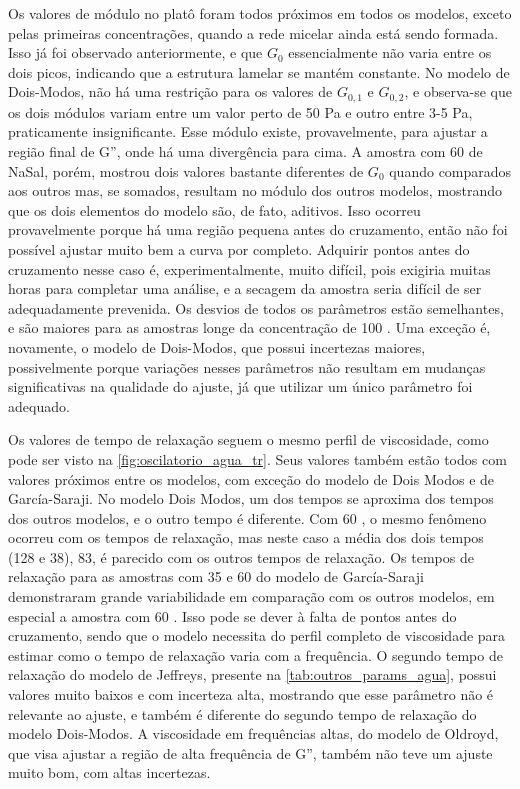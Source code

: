 	Os valores de módulo no platô foram todos próximos em todos os modelos, exceto pelas primeiras concentrações, quando a rede micelar ainda está sendo formada. Isso já foi observado anteriormente, e que \(G_0\) essencialmente não varia entre os dois picos, indicando que a estrutura lamelar se mantém constante.
	No modelo de Dois-Modos, não há uma restrição para os valores de \(G_{0,1}\) e \(G_{0,2}\), e observa-se que os dois módulos variam entre um valor perto de 50 Pa e outro entre 3-5 Pa, praticamente insignificante. Esse módulo existe, provavelmente, para ajustar a região final de G'', onde há uma divergência para cima. A amostra com 60 \mM{} de NaSal, porém, mostrou dois valores bastante diferentes de \(G_0\) quando comparados aos outros mas, se somados, resultam no módulo dos outros modelos, mostrando que os dois elementos do modelo são, de fato, aditivos. Isso ocorreu provavelmente porque há uma região pequena antes do cruzamento, então não foi possível ajustar muito bem a curva por completo. Adquirir pontos antes do cruzamento nesse caso é, experimentalmente, muito difícil, pois exigiria muitas horas para completar uma análise, e a secagem da amostra seria difícil de ser adequadamente prevenida. Os desvios de todos os parâmetros estão semelhantes, e são maiores para as amostras longe da concentração de 100 \mM. Uma exceção é, novamente, o modelo de Dois-Modos, que possui incertezas maiores, possivelmente porque variações nesses parâmetros não resultam em mudanças significativas na qualidade do ajuste, já que utilizar um único parâmetro foi adequado.
	
	Os valores de tempo de relaxação seguem o mesmo perfil de viscosidade, como pode ser visto na \autoref{fig:oscilatorio_agua_tr}. Seus valores também estão todos com valores próximos entre os modelos, com exceção do modelo de Dois Modos e de García-Saraji. No modelo Dois Modos, um dos tempos se aproxima dos tempos dos outros modelos, e o outro tempo é diferente. Com 60 \mM, o mesmo fenômeno ocorreu com os tempos de relaxação, mas neste caso a média dos dois tempos (128 e 38), 83, é parecido com os outros tempos de relaxação. Os tempos de relaxação para as amostras com 35 e 60 \mM{} do modelo de García-Saraji demonstraram grande variabilidade em comparação com os outros modelos, em especial a amostra com 60 \mM. Isso pode se dever à falta de pontos antes do cruzamento, sendo que o modelo necessita do perfil completo de viscosidade para estimar como o tempo de relaxação varia com a frequência. O segundo tempo de relaxação do modelo de Jeffreys, presente na \autoref{tab:outros_params_agua}, possui valores muito baixos e com incerteza alta, mostrando que esse parâmetro não é relevante ao ajuste, e também é diferente do segundo tempo de relaxação do modelo Dois-Modos. A viscosidade em frequências altas, do modelo de Oldroyd, que visa ajustar a região de alta frequência de G'', também não teve um ajuste muito bom, com altas incertezas.
	
